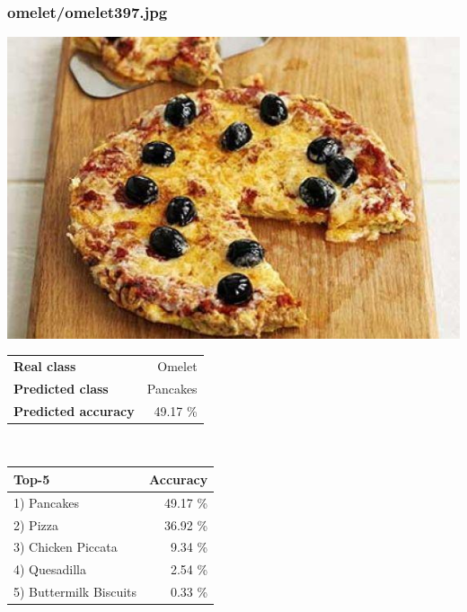 \subsubsection{omelet/omelet397.jpg}

\begin{minipage}[t]{0.4\textwidth}
	\vspace{0pt}
	\includegraphics[width=\linewidth]{images/evaluation-images/omelet/omelet397.jpg}
\end{minipage}
\hfill
\begin{minipage}[t]{0.5\textwidth}
	\vspace{0pt}\raggedright
	\begin{tabularx}{\textwidth}{X r}
		\small \textbf{Real class} & \small Omelet\\
		\small \textbf{Predicted class} & \small Pancakes\\
		\small \textbf{Predicted accuracy} & \small 49.17 \%
    \end{tabularx}\\
    
    \vspace{6pt}
	\begin{tabularx}{\textwidth}{X r}
        \small \textbf{Top-5} & \small \textbf{Accuracy} \\
        \hline
		\small 1) Pancakes & \small 49.17 \%\\\small 2) Pizza & \small 36.92 \%\\\small 3) Chicken Piccata & \small 9.34 \%\\\small 4) Quesadilla & \small 2.54 \%\\\small 5) Buttermilk Biscuits & \small 0.33 \%
    \end{tabularx}
\end{minipage}
    
